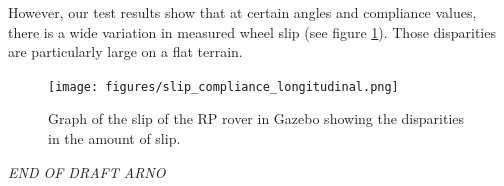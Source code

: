 \documentclass[twocolumn,letterpaper]{IEEEAerospaceCLS}  %
\begin{document}
However, our test results show that at certain angles and compliance values, there is a wide variation in measured wheel slip (see figure \ref{fig:slipdisparities}). Those disparities are particularly large on a flat terrain.
\begin{figure}[h!]
	\texttt{[image: figures/slip\_compliance\_longitudinal.png]}
   	\caption{Graph of the slip of the RP rover in Gazebo showing the disparities in the amount of slip.}
    \label{fig:slipdisparities}
\end{figure}

\textit{END OF DRAFT ARNO}
\end{document}
